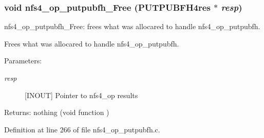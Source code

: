 \subsubsection{\setlength{\rightskip}{0pt plus 5cm}void nfs4\_\-op\_\-putpubfh\_\-Free (PUTPUBFH4res $\ast$ {\em resp})}\label{nfs4__op__putpubfh_8c_a4}


nfs4\_\-op\_\-putpubfh\_\-Free: frees what was allocared to handle nfs4\_\-op\_\-putpubfh.

Frees what was allocared to handle nfs4\_\-op\_\-putpubfh.

\begin{Desc}
\item[Parameters:]
\begin{description}
\item[{\em resp}][INOUT] Pointer to nfs4\_\-op results\end{description}
\end{Desc}
\begin{Desc}
\item[Returns:]nothing (void function ) \end{Desc}


Definition at line 266 of file nfs4\_\-op\_\-putpubfh.c.